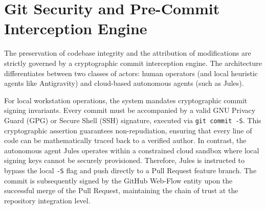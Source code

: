 \section{Git Security and Pre-Commit Interception Engine}
\label{sec:git_security}

The preservation of codebase integrity and the attribution of modifications are strictly governed by a cryptographic commit interception engine. The architecture differentiates between two classes of actors: human operators (and local heuristic agents like Antigravity) and cloud-based autonomous agents (such as Jules).

For local workstation operations, the system mandates cryptographic commit signing invariants. Every commit must be accompanied by a valid GNU Privacy Guard (GPG) or Secure Shell (SSH) signature, executed via \texttt{git commit -S}. This cryptographic assertion guarantees non-repudiation, ensuring that every line of code can be mathematically traced back to a verified author. In contrast, the autonomous agent Jules operates within a constrained cloud sandbox where local signing keys cannot be securely provisioned. Therefore, Jules is instructed to bypass the local \texttt{-S} flag and push directly to a Pull Request feature branch. The commit is subsequently signed by the GitHub Web-Flow entity upon the successful merge of the Pull Request, maintaining the chain of trust at the repository integration level.

